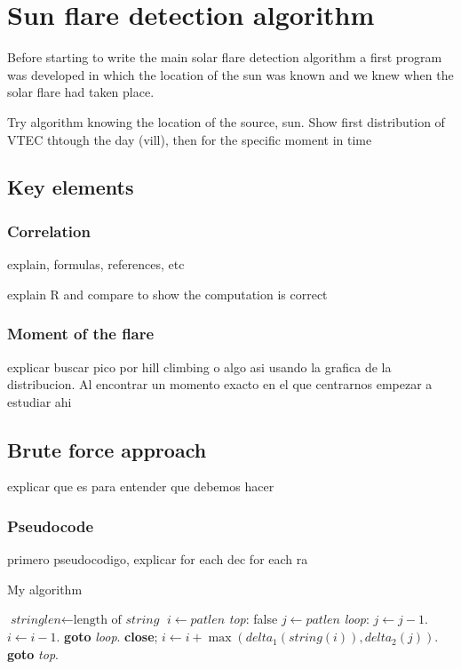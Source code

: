 \chapter{Sun flare detection algorithm}

Before starting to write the main solar flare detection algorithm a first program was developed in which the location of the sun was known and we knew when the solar flare had taken place.

Try algorithm knowing the location of the source, sun. Show first distribution of VTEC thtough the day (vill), then for the specific moment in time


\section{Key elements}

\subsection{Correlation}

explain, formulas, references, etc

explain R and compare to show the computation is correct

\subsection{Moment of the flare}

explicar buscar pico por hill climbing o algo asi usando la grafica de la distribucion. Al encontrar un momento exacto en el que centrarnos empezar a estudiar ahi





\section{Brute force approach}

explicar que es para entender que debemos hacer

\subsection{Pseudocode}

primero pseudocodigo, explicar for each dec for each ra


\begin{algorithm}
	\caption{My algorithm}\label{euclid}
	\begin{algorithmic}[1]
		\State $\textit{stringlen} \gets \text{length of }\textit{string}$
		\State $i \gets \textit{patlen}$
		\BState \emph{top}:
		 \Return false
		\EndIf
		\State $j \gets \textit{patlen}$
		\BState \emph{loop}:
		\State $j \gets j-1$.
		\State $i \gets i-1$.
		\State \textbf{goto} \emph{loop}.
		\State \textbf{close};
		\EndIf
		\State $i \gets i+\max(\textit{delta}_1(\textit{string}(i)),\textit{delta}_2(j))$.
		\State \textbf{goto} \emph{top}.
		\EndProcedure
	\end{algorithmic}
\end{algorithm}

